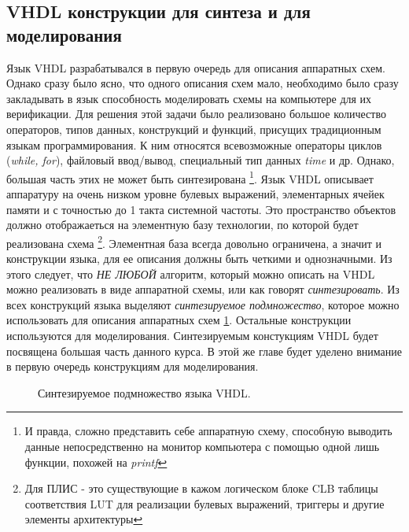 \subsection{VHDL конструкции для синтеза и для моделирования}


Язык VHDL разрабатывался в первую очередь для описания аппаратных схем. Однако сразу было ясно, что одного описания схем мало, необходимо было сразу закладывать в язык способность моделировать схемы на компьютере для их верификации. Для решения этой задачи было реализовано большое количество операторов, типов данных, конструкций и функций, присущих традиционным языкам программирования. К ним относятся всевозможные операторы циклов (\emph{while, for}), файловый ввод/вывод, специальный тип данных \emph{time} и др. Однако, большая часть этих не может быть синтезирована \footnote{И правда, сложно представить себе аппаратную схему, способную выводить данные непосредственно на монитор компьютера с помощью одной лишь функции, похожей на \emph{printf}}. Язык VHDL описывает аппаратуру на очень низком уровне булевых выражений, элементарных ячейек памяти и с точностью до 1 такта системной частоты. Это пространство объектов должно отображаеться на элементную базу технологии, по которой будет реализована схема \footnote{Для ПЛИС - это существующие в кажом логическом блоке CLB таблицы соответствия LUT для реализации булевых выражений, триггеры и другие элементы архитектуры}. Элементная база всегда довольно ограничена, а значит и конструкции языка, для ее описания должны быть четкими и однозначными. Из этого следует, что \emph{НЕ ЛЮБОЙ} алгоритм, который можно описать на VHDL можно реализовать в виде аппаратной схемы, или как говорят \emph{синтезировать}. Из всех конструкций языка выделяют \emph{синтезируемое подмножество}, которое можно использовать для описания аппаратных схем \ref{vhdl_set_1}. Остальные конструкции используются для моделирования. Синтезируемым констукциям VHDL будет посвящена большая часть данного курса. В этой же главе будет уделено внимание в первую очередь конструкциям для моделирования.

\begin{figure}[ht]
\centering
{}
\caption{Синтезируемое подмножество языка VHDL.}
\label{vhdl_set_1}
\end{figure}

